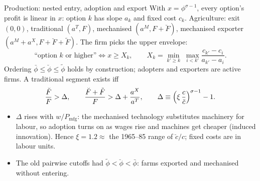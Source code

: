 \documentclass[10pt,aspectratio=169]{beamer}
\newcommand{\hl}[1]{\textcolor{mOrange}{#1}}
\begin{document}
\begin{frame}{Production: nested entry, adoption and export}
  \small
  With $x=\phi^{\sigma-1}$, every option's profit is linear in $x$: option $k$ has slope
  $a_k$ and fixed cost $c_k$. Agriculture: exit $(0,0)$, traditional $(a^T,F)$, mechanised
  $(a^M,F+\breve F)$, mechanised exporter $(a^M+a^X,F+\breve F+\tilde F)$. The firm picks
  the upper envelope:
  \begin{equation*}
    \text{``option }k\text{ or higher''}\iff x\ge X_k,\qquad
    X_k=\min_{k'\ge k}\;\max_{i<k'}\frac{c_{k'}-c_i}{a_{k'}-a_i}.
  \end{equation*}
  Ordering $\bar\phi\le\breve\phi\le\tilde\phi$ holds by construction; adopters and
  exporters are active firms. A traditional segment exists iff
  \begin{equation*}
    \frac{\breve F}{F}>\Delta,\qquad
    \frac{\breve F+\tilde F}{F}>\Delta+\frac{a^X}{a^T},\qquad
    \Delta\equiv\Bigl(\xi\,\frac{c}{\breve c}\Bigr)^{\sigma-1}-1 .
  \end{equation*}
  \begin{itemize}
    \item $\Delta$ rises with $w/P_{\text{mfg}}$: the mechanised technology substitutes
          machinery for labour, so adoption turns on as \hl{wages rise and machines get
          cheaper} (induced innovation). Hence $\xi=1.2\approx$ the 1965--85 range of
          $\breve c/c$; fixed costs are in labour units.
    \item The old pairwise cutoffs had $\tilde\phi<\breve\phi<\bar\phi$: farms exported and
          mechanised without entering.
  \end{itemize}
\end{frame}
\end{document}
